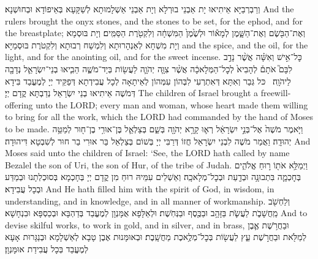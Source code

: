{{{}}
{וְרַבְרְבַיָּא אֵיתִיאוּ יָת אַבְנֵי בוּרְלָא וְיָת אַבְנֵי אַשְׁלָמוּתָא לְשַׁקָּעָא בְּאֵיפוֹדָא וּבְחוּשְׁנָא׃}
{And the rulers brought the onyx stones, and the stones to be set, for the ephod, and for the breastplate;}{}
{וְאֶת־הַבֹּ֖שֶׂם וְאֶת־הַשָּׁ֑מֶן לְמָא֕וֹר וּלְשֶׁ֙מֶן֙ הַמִּשְׁחָ֔ה וְלִקְטֹ֖רֶת הַסַּמִּֽים׃}
{וְיָת בּוּסְמָא וְיָת מִשְׁחָא לְאַנְהָרוּתָא וְלִמְשַׁח רְבוּתָא וְלִקְטֹרֶת בּוּסְמַיָּא׃}
{and the spice, and the oil, for the light, and for the anointing oil, and for the sweet incense.}{}
{כׇּל־אִ֣ישׁ וְאִשָּׁ֗ה אֲשֶׁ֨ר נָדַ֣ב לִבָּם֮ אֹתָם֒ לְהָבִיא֙ לְכׇל־הַמְּלָאכָ֔ה אֲשֶׁ֨ר צִוָּ֧ה יְהֹוָ֛ה לַעֲשׂ֖וֹת בְּיַד־מֹשֶׁ֑ה הֵבִ֧יאוּ בְנֵי־יִשְׂרָאֵ֛ל נְדָבָ֖ה לַיהֹוָֽה׃ \petucha }
{כּל גְּבַר וְאִתָּא דְּאִתְרְעִי לִבְּהוֹן עִמְּהוֹן לְאֵיתָאָה לְכָל עֲבִידְתָא דְּפַקֵּיד יְיָ לְמֶעֱבַד בִּידָא דְּמֹשֶׁה אֵיתִיאוּ בְנֵי יִשְׂרָאֵל נְדַבְתָּא קֳדָם יְיָ׃}
{The children of Israel brought a freewill-offering unto the LORD; every man and woman, whose heart made them willing to bring for all the work, which the LORD had commanded by the hand of Moses to be made.}{}
{וַיֹּ֤אמֶר מֹשֶׁה֙ אֶל־בְּנֵ֣י יִשְׂרָאֵ֔ל רְא֛וּ קָרָ֥א יְהֹוָ֖ה בְּשֵׁ֑ם בְּצַלְאֵ֛ל בֶּן־אוּרִ֥י בֶן־ח֖וּר לְמַטֵּ֥ה יְהוּדָֽה׃
}
{וַאֲמַר מֹשֶׁה לִבְנֵי יִשְׂרָאֵל חֲזוֹ דְּרַבִּי יְיָ בְּשׁוֹם בְּצַלְאֵל בַּר אוּרִי בַר חוּר לְשִׁבְטָא דִּיהוּדָה׃}
{And Moses said unto the children of Israel: ‘See, the LORD hath called by name Bezalel the son of Uri, the son of Hur, of the tribe of Judah.}{}
{וַיְמַלֵּ֥א אֹת֖וֹ ר֣וּחַ אֱלֹהִ֑ים בְּחׇכְמָ֛ה בִּתְבוּנָ֥ה וּבְדַ֖עַת וּבְכׇל־מְלָאכָֽה׃}
{וְאַשְׁלֵים עִמֵּיהּ רוּחַ מִן קֳדָם יְיָ בְּחָכְמָא בְּסוּכְלְתָנוּ וּבְמַדַּע וּבְכָל עֲבִידָא׃}
{And He hath filled him with the spirit of God, in wisdom, in understanding, and in knowledge, and in all manner of workmanship.}{}
{וְלַחְשֹׁ֖ב מַֽחֲשָׁבֹ֑ת לַעֲשֹׂ֛ת בַּזָּהָ֥ב וּבַכֶּ֖סֶף וּבַנְּחֹֽשֶׁת׃}
{וּלְאַלָּפָא אֻמָּנְוָן לְמֶעֱבַד בְּדַהְבָּא וּבְכַסְפָּא וּבִנְחָשָׁא׃}
{And to devise skilful works, to work in gold, and in silver, and in brass,}{}
{וּבַחֲרֹ֥שֶׁת אֶ֛בֶן לְמַלֹּ֖את וּבַחֲרֹ֣שֶׁת עֵ֑ץ לַעֲשׂ֖וֹת בְּכׇל־מְלֶ֥אכֶת מַחֲשָֽׁבֶת׃}
{וּבְאוּמָּנוּת אֶבֶן טָבָא לְאַשְׁלָמָא וּבְנַגָּרוּת אָעָא לְמֶעֱבַד בְּכָל עֲבִידַת אוּמָּנְוָן׃}
}
